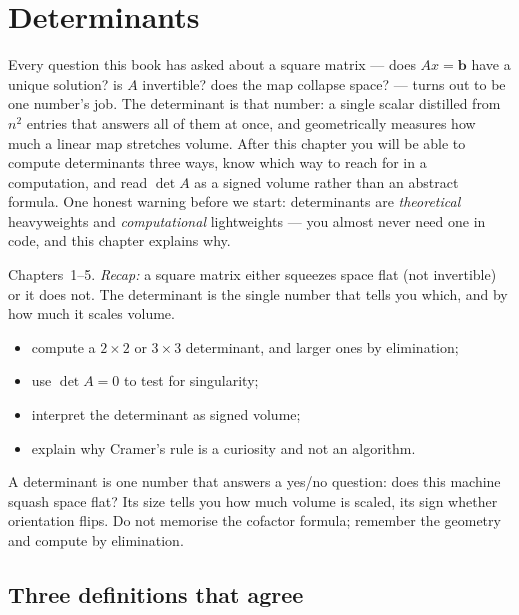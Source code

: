 \chapter{Determinants}\label{ch:determinants}

Every question this book has asked about a square matrix --- does
$Ax=\mathbf b$ have a unique solution? is $A$ invertible? does the map
collapse space? --- turns out to be one number's job. The determinant is
that number: a single scalar distilled from $n^2$ entries that answers all
of them at once, and geometrically measures how much a linear map stretches
volume. After this chapter you will be able to compute determinants three
ways, know which way to reach for in a computation, and read $\det A$ as a
signed volume rather than an abstract formula. One honest warning before we
start: determinants are \emph{theoretical} heavyweights and
\emph{computational} lightweights --- you almost never need one in code,
and this chapter explains why.

\begin{rulebox}
Chapters~1--5. \emph{Recap:} a square matrix either squeezes space flat (not invertible) or it does not. The determinant is the single number that tells you which, and by how much it scales volume.
\end{rulebox}
\begin{wins}
\begin{itemize}
\item compute a $2\times2$ or $3\times3$ determinant, and larger ones by elimination;
\item use $\det A=0$ to test for singularity;
\item interpret the determinant as signed volume;
\item explain why Cramer's rule is a curiosity and not an algorithm.
\end{itemize}
\end{wins}
\begin{principle}
A determinant is one number that answers a yes/no question: does this machine squash space flat? Its size tells you how much volume is scaled, its sign whether orientation flips. Do not memorise the cofactor formula; remember the geometry and compute by elimination.
\end{principle}

\section{Three definitions that agree}\label{sec:det-defs}

